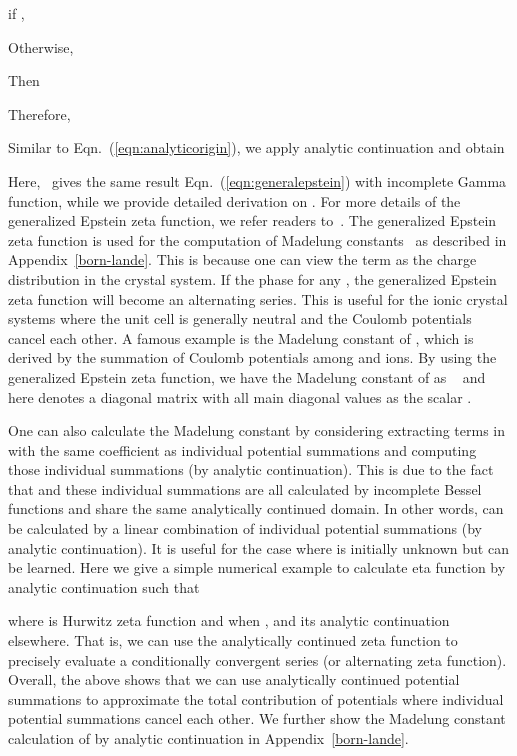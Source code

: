 \documentclass[nohyperref]{article}
\theoremstyle{plain}
\theoremstyle{definition}
\theoremstyle{remark}
\begin{document}
if ,

Otherwise,

Then

Therefore,

Similar to Eqn.~(\ref{eqn:analyticorigin}), we apply analytic continuation and obtain

Here,~\citet{epstein} gives the same result Eqn.~(\ref{eqn:generalepstein}) with incomplete Gamma function, while we provide detailed derivation on . For more details of the generalized Epstein zeta function, we refer readers to~\citet{crandall1987elementary, terras1973bessel, epstein, kirsten1994generalized, selberg1967epstein}. The generalized Epstein zeta function is used for the computation of Madelung constants~\citep{epstein} as described in Appendix~\ref{born-lande}. This is because one can view the term  as the charge distribution in the crystal system. If the phase  for any , the generalized Epstein zeta function will become an alternating series. This is useful for the ionic crystal systems where the unit cell is generally neutral and the Coulomb potentials cancel each other. A famous example is the Madelung constant of , which is derived by the summation of Coulomb potentials among  and  ions. By using the generalized Epstein zeta function, we have the Madelung constant of  as ~\citep{epstein} and here  denotes a diagonal matrix with all main diagonal values as the scalar . 

One can also calculate the Madelung constant by considering extracting terms in  with the same coefficient  as individual potential summations and computing those individual summations (by analytic continuation). This is due to the fact that  and these individual summations are all calculated by incomplete Bessel functions and share the same analytically continued domain. In other words,  can be calculated by a linear combination of individual potential summations (by analytic continuation). It is useful for the case where  is initially unknown but can be learned. Here we give a simple numerical example to calculate eta function  by analytic continuation such that 

where  is Hurwitz zeta function and  when , and its analytic continuation elsewhere. That is, we can use the analytically continued zeta function  to precisely evaluate a conditionally convergent series (or alternating zeta function). Overall, the above shows that we can use analytically continued potential summations to approximate the total contribution of potentials where individual potential summations cancel each other. We further show the Madelung constant calculation of  by analytic continuation in Appendix~\ref{born-lande}.  
\end{document}
